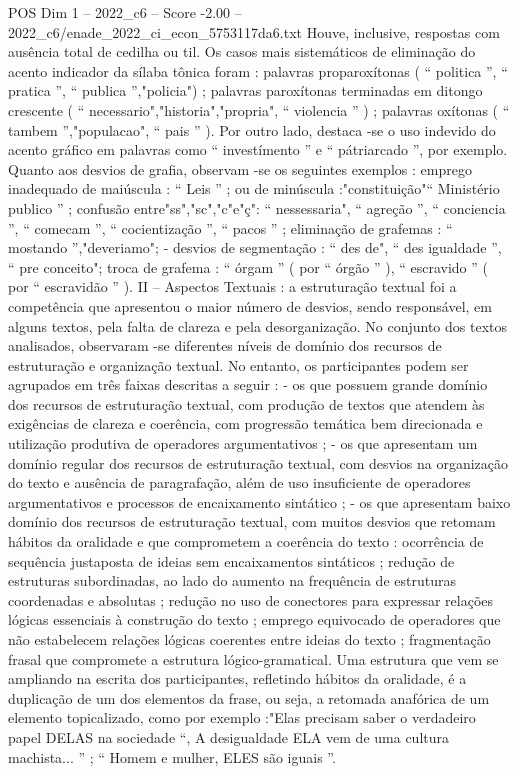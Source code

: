 \begin{textsample}{POS Dim 1 – 2022\_c6 – Score -2.00 – 2022\_c6/enade\_2022\_ci\_econ\_5753117da6.txt}
Houve, inclusive, respostas com ausência total de cedilha ou til.
Os casos mais sistemáticos de eliminação do acento indicador da sílaba tônica foram : palavras proparoxítonas ( “ politica ”, “ pratica ”, “ publica ”,"policia") ; palavras paroxítonas terminadas em ditongo crescente ( “ necessario","historia","propria", “ violencia ” ) ; palavras oxítonas ( “ tambem ”,"populacao", “ pais ” ).
Por outro lado, destaca -se o uso indevido do acento gráfico em palavras como “ investímento ” e “ pátriarcado ”, por exemplo.
Quanto aos desvios de grafia, observam -se os seguintes exemplos : emprego inadequado de maiúscula : “ Leis ” ; ou de minúscula :"constituição"“ Ministério publico ” ; confusão entre"ss","sc","c"e"ç": “ nessessaria", “ agreção ”, “ conciencia ”, “ comecam ”, “ cocientização ”, “ pacos ” ; eliminação de grafemas : “ mostando ”,"deveriamo"; - desvios de segmentação : “ des de", “ des igualdade ”, “ pre conceito"; troca de grafema : “ órgam ” ( por “ órgão ” ), “ escravido ” ( por “ escravidão ” ).
II – Aspectos Textuais : a estruturação textual foi a competência que apresentou o maior número de desvios, sendo responsável, em alguns textos, pela falta de clareza e pela desorganização.
No conjunto dos textos analisados, observaram -se diferentes níveis de domínio dos recursos de estruturação e organização textual.
No entanto, os participantes podem ser agrupados em três faixas descritas a seguir : - os que possuem grande domínio dos recursos de estruturação textual, com produção de textos que atendem às exigências de clareza e coerência, com progressão temática bem direcionada e utilização produtiva de operadores argumentativos ; - os que apresentam um domínio regular dos recursos de estruturação textual, com desvios na organização do texto e ausência de paragrafação, além de uso insuficiente de operadores argumentativos e processos de encaixamento sintático ; - os que apresentam baixo domínio dos recursos de estruturação textual, com muitos desvios que retomam hábitos da oralidade e que comprometem a coerência do texto : ocorrência de sequência justaposta de ideias sem encaixamentos sintáticos ; redução de estruturas subordinadas, ao lado do aumento na frequência de estruturas coordenadas e absolutas ; redução no uso de conectores para expressar relações lógicas essenciais à construção do texto ; emprego equivocado de operadores que não estabelecem relações lógicas coerentes entre ideias do texto ; fragmentação frasal que compromete a estrutura lógico-gramatical.
Uma estrutura que vem se ampliando na escrita dos participantes, refletindo hábitos da oralidade, é a duplicação de um dos elementos da frase, ou seja, a retomada anafórica de um elemento topicalizado, como por exemplo :"Elas precisam saber o verdadeiro papel DELAS na sociedade “, A desigualdade ELA vem de uma cultura machista... ” ; “ Homem e mulher, ELES são iguais ”.

\end{textsample}
